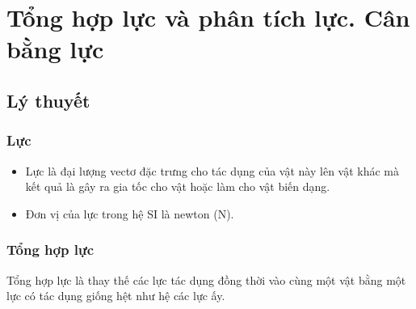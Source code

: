 \let\lesson\undefined
\newcommand{\lesson}{\phantomlesson{Bài 10: Tổng hợp lực và phân tích lực. Cân bằng lực}}
\chapter[Tổng hợp lực và phân tích lực. Cân bằng lực]{Tổng hợp lực và phân tích lực. Cân bằng lực}
\setcounter{section}{0}
\section{Lý thuyết}
\subsection{Lực}
\begin{itemize}
	\item Lực là đại lượng vectơ đặc trưng cho tác dụng của vật này lên vật khác mà kết quả là gây ra gia tốc cho vật hoặc làm cho vật biến dạng.
	\item Đơn vị của lực trong hệ SI là newton (N).	
\end{itemize}
\subsection{Tổng hợp lực}
Tổng hợp lực là thay thế các lực tác dụng đồng thời vào cùng một vật bằng một lực có tác dụng giống hệt như hệ các lực ấy.


